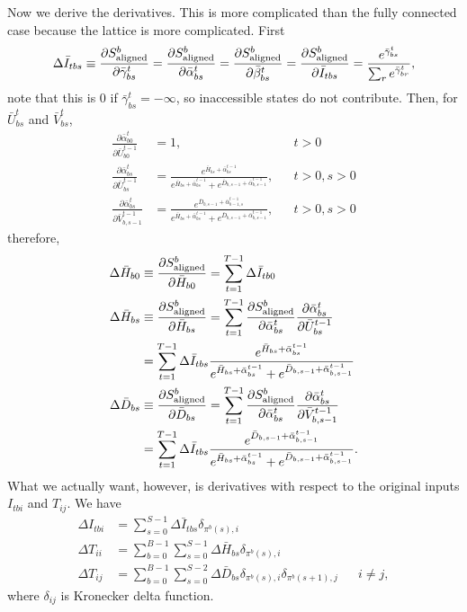 \documentclass[a4paper]{article}
\begin{document}
Now we derive the derivatives. This is more complicated than the fully connected case because the lattice is more complicated. First
\begin{equation}
\Delta \bar{I}_{tbs} \equiv \frac{\partial S^b_{\rm{aligned}}}{\partial\bar\gamma^t_{bs}}=\frac{\partial S^b_{\rm{aligned}}}{\partial\bar\alpha^t_{bs}}=\frac{\partial S^b_{\rm{aligned}}}{\partial\bar\beta^t_{bs}}=\frac{\partial S^b_{\rm{aligned}}}{\partial \bar I_{tbs}}=\frac{e^{\bar\gamma^t_{bs}}}{\sum_r e^{\bar\gamma^t_{br}}},
\end{equation}
note that this is $0$ if $\bar\gamma^t_{bs}=-\infty$, so inaccessible states do not contribute. Then, for $\bar U^{t}_{bs}$ and $\bar V^{t}_{bs}$,
\begin{align}
\frac{\partial \bar\alpha^t_{b0}}{\partial \bar{U}^{t-1}_{b0}} &= 1, 
&& t>0 \\
\frac{\partial \bar\alpha^t_{bs}}{\partial \bar{U}^{t-1}_{bs}}
&=\frac{e^{\bar{H}_{bs}+\bar\alpha^{t-1}_{bs}}}{e^{\bar{H}_{bs}+\bar\alpha^{t-1}_{bs}} + e^{\bar{D}_{b,s-1}+\bar\alpha^{t-1}_{b,s-1}}},
&& t>0, s>0\\
\frac{\partial \bar\alpha^t_{bs}}{\partial \bar{V}^{t-1}_{b,s-1}}
&=\frac{e^{\bar{D}_{b,s-1}+\bar\alpha^{t-1}_{b-1,s}}}{e^{\bar{H}_{bs}+\bar\alpha^{t-1}_{bs}} + e^{\bar{D}_{b,s-1}+\bar\alpha^{t-1}_{b,s-1}}},
&& t>0, s>0
\end{align}
therefore,
\begin{align}
\Delta\bar{H}_{b0}&\equiv\frac{\partial S^b_{\rm{aligned}}}{\partial\bar{H}_{b0}}
=\sum_{t=1}^{T-1}\Delta\bar I_{tb0}\\
\Delta\bar{H}_{bs}&\equiv\frac{\partial S^b_{\rm{aligned}}}{\partial\bar{H}_{bs}}
=\sum_{t=1}^{T-1}\frac{\partial S^b_{\rm{aligned}}}{\partial\bar\alpha^t_{bs}}\frac{\partial\bar\alpha^t_{bs}}{\partial\bar U^{t-1}_{bs}}\\
&=\sum_{t=1}^{T-1}\Delta\bar I_{tbs}\frac{e^{\bar{H}_{bs}+\bar\alpha^{t-1}_{bs}}}{e^{\bar{H}_{bs}+\bar\alpha^{t-1}_{bs}} + e^{\bar{D}_{b,s-1}+\bar\alpha^{t-1}_{b,s-1}}}\\
\Delta\bar{D}_{bs}&\equiv\frac{\partial S^b_{\rm{aligned}}}{\partial\bar{D}_{bs}}
=\sum_{t=1}^{T-1}\frac{\partial S^b_{\rm{aligned}}}{\partial\bar\alpha^t_{bs}}\frac{\partial\bar\alpha^t_{bs}}{\partial\bar V^{t-1}_{b,s-1}}\\
&=\sum_{t=1}^{T-1}\Delta\bar I_{tbs}\frac{e^{\bar{D}_{b,s-1}+\bar\alpha^{t-1}_{b,s-1}}}{e^{\bar{H}_{bs}+\bar\alpha^{t-1}_{bs}} + e^{\bar{D}_{b,s-1}+\bar\alpha^{t-1}_{b,s-1}}}.
\end{align}
What we actually want, however, is derivatives with respect to the original inputs $I_{tbi}$ and $T_{ij}$. We have
\begin{align}
\Delta I_{tbi}&=\sum_{s=0}^{S-1}\Delta\bar I_{tbs}\delta_{\pi^b(s),i}\\
\Delta T_{ii}&=\sum_{b=0}^{B-1}\sum_{s=0}^{S-1}\Delta\bar H_{bs} \delta_{\pi^b(s),i}\\
\Delta T_{ij}&=\sum_{b=0}^{B-1}\sum_{s=0}^{S-2}\Delta\bar D_{bs} \delta_{\pi^b(s),i}\delta_{\pi^b(s+1),j} && i\neq j,
\end{align}
where $\delta_{ij}$ is Kronecker delta function.
\end{document}
